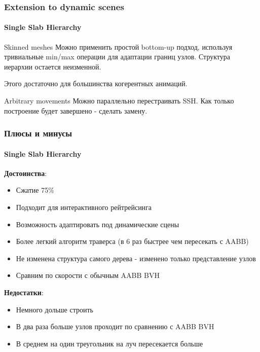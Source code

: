 \documentclass{beamer}
\begin{document}
\begin{frame}
    \frametitle{Extension to dynamic scenes}
    \framesubtitle{Single Slab Hierarchy}
    \begin{block}{Skinned meshes}
        Можно применить простой bottom-up подход,
        используя тривиальные min/max операции для адаптации границ узлов.
        Структура иерархии остается неизменной.

        Этого достаточно для большинства когерентных анимаций.
    \end{block}

    \begin{block}{Arbitrary movements}
        Можно параллельно перестраивать SSH. Как только построение будет завершено - сделать замену.
    \end{block}

\end{frame}

\begin{frame}[t]
    \frametitle{Плюсы и минусы}
    \framesubtitle{Single Slab Hierarchy}
    \textbf{Достоинства}:
    \begin{itemize}
        \item
            Сжатие 75\%
        \item
            Подходит для интерактивного рейтрейсинга
        \item
            Возможность адаптировать под динамические сцены
        \item
            Более легкий алгоритм траверса (в 6 раз быстрее чем пересекать с AABB)
        \item
            Не изменена структура самого дерева - изменено только представление узлов
        \item
            Сравним по скорости с обычным AABB BVH
    \end{itemize}
    \textbf{Недостатки}:
    \begin{itemize}
        \item
            Немного дольше строить
        \item
            В два раза больше узлов проходит по сравнению с AABB BVH
        \item
            В среднем на один треугольник на луч пересекается больше
    \end{itemize}
\end{frame}
\end{document}
